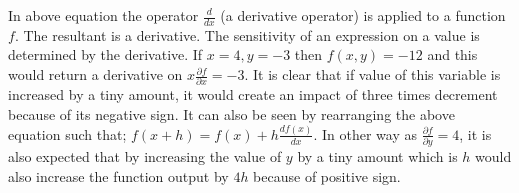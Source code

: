 \documentclass[11pt]{article}
\begin{document}
In above equation the operator $ \frac{d}{d x} $ (a derivative operator) is applied to a function $f$. The resultant is a derivative. The sensitivity of an expression on a value is determined by the derivative. If $x=4, y=-3$ then $f(x, y)=-12$ and this would return a derivative on $x \frac{\partial f}{\partial x}=-3$. It is clear that if value of this variable is increased by a tiny amount, it would create an impact of three times decrement because of its negative sign. It can also be seen by rearranging the above equation such that; $f(x+h)=f(x)+h \frac{d f(x)}{d x}$. In other way as $\frac{\partial f}{\partial y}=4$, it is also expected that by increasing the value of $y$ by a tiny amount which is $h$ would also increase the function output by $4h$ because of positive sign.

\end{document}
